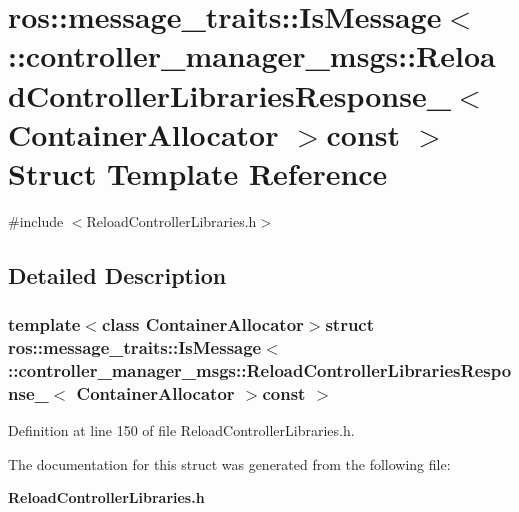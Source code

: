 \section{ros\-:\-:message\-\_\-traits\-:\-:\-Is\-Message$<$ \-:\-:controller\-\_\-manager\-\_\-msgs\-:\-:\-Reload\-Controller\-Libraries\-Response\-\_\-$<$ \-Container\-Allocator $>$const $>$ \-Struct \-Template \-Reference}
\label{structros_1_1message__traits_1_1IsMessage_3_01_1_1controller__manager__msgs_1_1ReloadControllerL3abbd286e03e924437988aa12f1acd61}


{\ttfamily \#include $<$\-Reload\-Controller\-Libraries.\-h$>$}



\subsection{\-Detailed \-Description}
\subsubsection*{template$<$class Container\-Allocator$>$struct ros\-::message\-\_\-traits\-::\-Is\-Message$<$ \-::controller\-\_\-manager\-\_\-msgs\-::\-Reload\-Controller\-Libraries\-Response\-\_\-$<$ Container\-Allocator $>$const  $>$}



\-Definition at line 150 of file \-Reload\-Controller\-Libraries.\-h.



\-The documentation for this struct was generated from the following file\-:\begin{DoxyCompactItemize}
\item 
{\bf \-Reload\-Controller\-Libraries.\-h}\end{DoxyCompactItemize}
